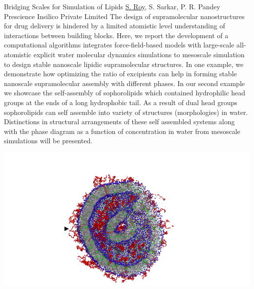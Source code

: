 
    \begin{abstract_online}{Bridging Scales for Simulation of Lipids}{%
        \underline{S. Roy}, S. Sarkar, P. R. Pandey}{%
        \IStag}{%
        Prescience Insilico Private Limited}
    The design of supramolecular nanostructures for drug delivery is hindered by a limited atomistic level understanding of interactions between building blocks. Here, we report the development of a computational algorithms integrates force-field-based models with large-scale all-atomistic explicit water molecular dynamics simulations to mesoscale simulation to design stable nanoscale lipidic supramolecular structures. In one example, we demonstrate how optimizing the ratio of excipients can help in forming stable nanoscale supramolecular assembly with different phases. In our second example we showcase the self-assembly of sophorolipids which contained hydrophilic head groups at the ends of a long hydrophobic tail. As a result of dual head groups sophorolipids can self assemble into variety of structures (morphologies) in water. Distinctions in structural arrangements of these self assembled systems along with the phase diagram as a function of concentration in water from mesoscale simulations will be presented. \begin{center}  \includegraphics[width=\linewidth]{abstracts/txt/figures/sudip.png}  \caption{Self-assembled supramolecule for drug delivery.}  \end{center}  
    

\end{abstract_online}
